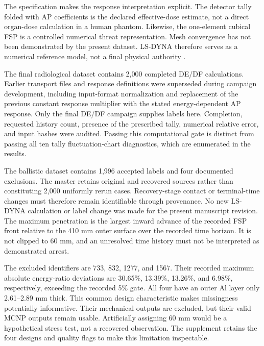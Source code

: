 \documentclass[12pt]{elsarticle}
\begin{document}
The specification makes the response interpretation explicit. The detector tally folded with AP coefficients is the declared effective-dose estimate, not a direct organ-dose calculation in a human phantom. Likewise, the one-element cubical FSP is a controlled numerical threat representation. Mesh convergence has not been demonstrated by the present dataset. LS-DYNA therefore serves as a numerical reference model, not a final physical authority \cite{Kulesza2022MCNP63,Hallquist2006,JohnsonCook1983,JohnsonHolmquist1994}.

The final radiological dataset contains 2,000 completed DE/DF calculations. Earlier transport files and response definitions were superseded during campaign development, including input-format normalization and replacement of the previous constant response multiplier with the stated energy-dependent AP response. Only the final DE/DF campaign supplies labels here. Completion, requested history count, presence of the prescribed tally, numerical relative error, and input hashes were audited. Passing this computational gate is distinct from passing all ten tally fluctuation-chart diagnostics, which are enumerated in the results.

The ballistic dataset contains 1,996 accepted labels and four documented exclusions. The master retains original and recovered sources rather than constituting 2,000 uniformly rerun cases. Recovery-stage contact or terminal-time changes must therefore remain identifiable through provenance. No new LS-DYNA calculation or label change was made for the present manuscript revision. The maximum penetration is the largest inward advance of the recorded FSP front relative to the 410 mm outer surface over the recorded time horizon. It is not clipped to 60 mm, and an unresolved time history must not be interpreted as demonstrated arrest.

The excluded identifiers are 733, 832, 1277, and 1567. Their recorded maximum absolute energy-ratio deviations are 30.65\%, 13.39\%, 13.26\%, and 6.98\%, respectively, exceeding the recorded 5\% gate. All four have an outer Al layer only 2.61--2.89 mm thick. This common design characteristic makes missingness potentially informative. Their mechanical outputs are excluded, but their valid MCNP outputs remain usable. Artificially assigning 60 mm would be a hypothetical stress test, not a recovered observation. The supplement retains the four designs and quality flags to make this limitation inspectable.
\end{document}
